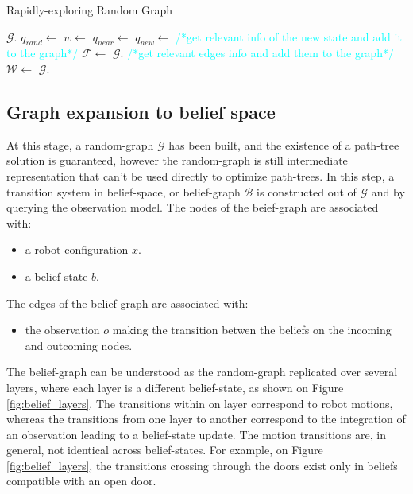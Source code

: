 \documentclass[letterpaper, 10 pt, conference]{ieeeconf}  %
\begin{document}
\begin{algorithm}[H]
\caption{Rapidly-exploring Random Graph}
\label{alg:rrg}
\begin{algorithmic}[1]
	\State $\mathcal{G}$.
    	\State $q_{rand} \gets$ 
    	\State $w \gets$ 
    	\State $q_{near} \gets$ 
    	\State $q_{new} \gets$ 
    	\State \textcolor{cyan}{\footnotesize/*get relevant info of the new state and add it to the graph*/}
    	    \State $\mathcal{F} \gets$ 
    		\State $\mathcal{G}$.
    		\State \textcolor{cyan}{\footnotesize/*get relevant edges info and add them to the graph*/}
    			\State $\mathcal{W} \gets$ 
    				\State $\mathcal{G}$.
    			\EndIf
    		\EndFor
    	\EndIf
    \EndWhile
\EndFunction
\Statex
\end{algorithmic}
\end{algorithm}

\subsection{Graph expansion to belief space}
\label{section:graph_expansion_belief_space}
At this stage, a random-graph $\mathcal{G}$ has been built, and the existence of a path-tree solution is guaranteed, however the random-graph is still intermediate representation that can't be used directly to optimize path-trees. In this step, a transition system in belief-space, or belief-graph $\mathcal{B}$ is constructed out of $\mathcal{G}$ and by querying the observation model. 
The nodes of the beief-graph are associated with:
\begin{itemize}
\item a robot-configuration $x$.
\item a belief-state $b$.
\end{itemize}
The edges of the belief-graph are associated with:
\begin{itemize}
\item the observation $o$ making the transition betwen the beliefs on the incoming and outcoming nodes.
\end{itemize}
The belief-graph can be understood as the random-graph replicated over several layers, where each layer is a different belief-state, as shown on Figure \ref{fig:belief_layers}. The transitions within on layer correspond to robot motions, whereas the transitions from one layer to another correspond to the integration of an observation leading to a belief-state update. The motion transitions are, in general, not identical across belief-states. For example, on Figure \ref{fig:belief_layers}, the transitions crossing through the doors exist only in beliefs compatible with an open door.
  
\end{document}
